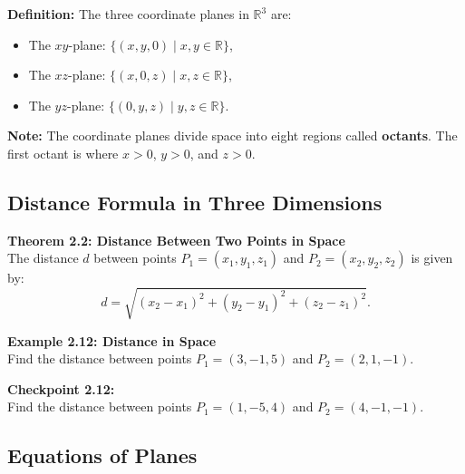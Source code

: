 \documentclass{article}
\begin{document}
\begin{definitionbox}
    \textbf{Definition:} The three coordinate planes in \(\mathbb{R}^3\) are:
    \begin{itemize}
        \item The \(xy\)-plane: \(\{(x, y, 0) \mid x, y \in \mathbb{R}\}\),
        \item The \(xz\)-plane: \(\{(x, 0, z) \mid x, z \in \mathbb{R}\}\),
        \item The \(yz\)-plane: \(\{(0, y, z) \mid y, z \in \mathbb{R}\}\).
    \end{itemize}
\end{definitionbox}

\begin{notebox}
    \textbf{Note:} The coordinate planes divide space into eight regions called \textbf{octants}. The first octant is where \(x > 0\), \(y > 0\), and \(z > 0\).
\end{notebox}

\subsection*{Distance Formula in Three Dimensions}

\begin{theorembox}
    \textbf{Theorem 2.2: Distance Between Two Points in Space} \\
    The distance \(d\) between points \(P_1 = (x_1, y_1, z_1)\) and \(P_2 = (x_2, y_2, z_2)\) is given by:
    \[
    d = \sqrt{(x_2 - x_1)^2 + (y_2 - y_1)^2 + (z_2 - z_1)^2}.
    \]
\end{theorembox}

\begin{examplebox}
    \textbf{Example 2.12: Distance in Space} \\
    Find the distance between points \(P_1 = (3, -1, 5)\) and \(P_2 = (2, 1, -1)\).
\end{examplebox}

\begin{exercisebox}
    \textbf{Checkpoint 2.12:} \\
    Find the distance between points \(P_1 = (1, -5, 4)\) and \(P_2 = (4, -1, -1)\).
\end{exercisebox}

\subsection*{Equations of Planes}
\end{document}
